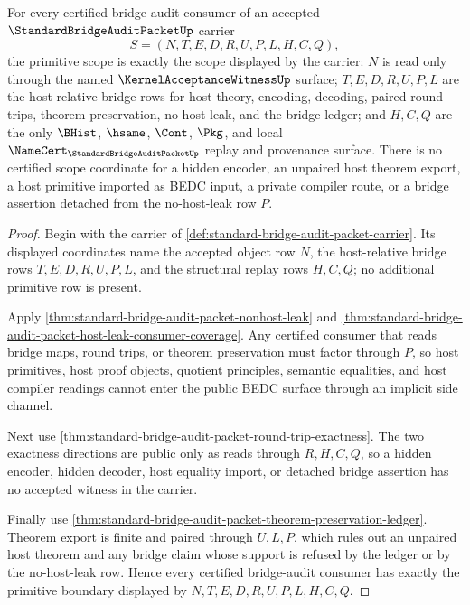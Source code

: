 \begin{theorem}
\label{thm:standard-bridge-audit-packet-scoped-primitive-binding}
For every certified bridge-audit consumer of an accepted $\StandardBridgeAuditPacketUp$ carrier
$$
S=(N,T,E,D,R,U,P,L,H,C,Q),
$$
the primitive scope is exactly the scope displayed by the carrier: $N$ is read only through the named $\KernelAcceptanceWitnessUp$ surface; $T,E,D,R,U,P,L$ are the host-relative bridge rows for host theory, encoding, decoding, paired round trips, theorem preservation, no-host-leak, and the bridge ledger; and $H,C,Q$ are the only $\BHist$, $\hsame$, $\Cont$, $\Pkg$, and local $\NameCert_{\StandardBridgeAuditPacketUp}$ replay and provenance surface. There is no certified scope coordinate for a hidden encoder, an unpaired host theorem export, a host primitive imported as BEDC input, a private compiler route, or a bridge assertion detached from the no-host-leak row $P$.
\end{theorem}
\begin{proof}
Begin with the carrier of \autoref{def:standard-bridge-audit-packet-carrier}. Its displayed coordinates name the accepted object row $N$, the host-relative bridge rows $T,E,D,R,U,P,L$, and the structural replay rows $H,C,Q$; no additional primitive row is present.

Apply \autoref{thm:standard-bridge-audit-packet-nonhost-leak} and \autoref{thm:standard-bridge-audit-packet-host-leak-consumer-coverage}. Any certified consumer that reads bridge maps, round trips, or theorem preservation must factor through $P$, so host primitives, host proof objects, quotient principles, semantic equalities, and host compiler readings cannot enter the public BEDC surface through an implicit side channel.

Next use \autoref{thm:standard-bridge-audit-packet-round-trip-exactness}. The two exactness directions are public only as reads through $R,H,C,Q$, so a hidden encoder, hidden decoder, host equality import, or detached bridge assertion has no accepted witness in the carrier.

Finally use \autoref{thm:standard-bridge-audit-packet-theorem-preservation-ledger}. Theorem export is finite and paired through $U,L,P$, which rules out an unpaired host theorem and any bridge claim whose support is refused by the ledger or by the no-host-leak row. Hence every certified bridge-audit consumer has exactly the primitive boundary displayed by $N,T,E,D,R,U,P,L,H,C,Q$.
\end{proof}


